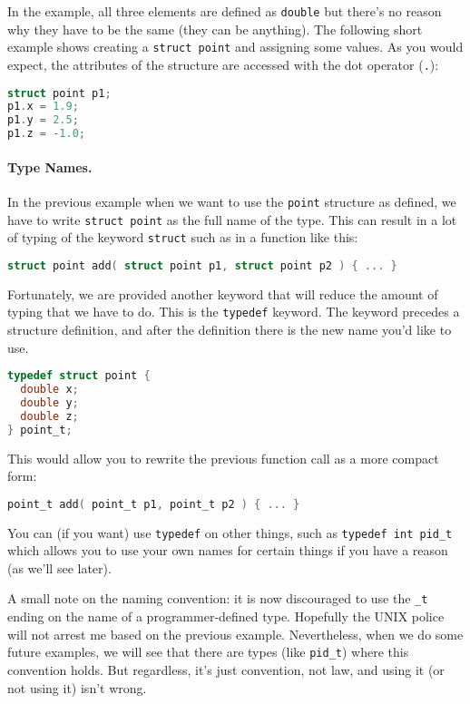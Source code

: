 In the example, all three elements are defined as \texttt{double} but there's no reason why they have to be the same (they can be anything). The following short example shows creating a \texttt{struct point} and assigning some values. As you would expect, the attributes of the structure are accessed with the dot operator (\texttt{.}):

\begin{lstlisting}[language=C]
struct point p1;
p1.x = 1.9;
p1.y = 2.5;
p1.z = -1.0;
\end{lstlisting}

\paragraph{Type Names.}
In the previous example when we want to use the \texttt{point} structure as defined, we have to write \texttt{struct point} as the full name of the type. This can result in a lot of typing of the keyword \texttt{struct} such as in a function like this:

\begin{lstlisting}[language=C]
struct point add( struct point p1, struct point p2 ) { ... }
\end{lstlisting}

Fortunately, we are provided another keyword that will reduce the amount of typing that we have to do. This is the \texttt{typedef} keyword. The keyword precedes a structure definition, and after the definition there is the new name you'd like to use.

\begin{lstlisting}[language=C]
typedef struct point {
  double x;
  double y;
  double z;
} point_t;
\end{lstlisting}

This would allow you to rewrite the previous function call as a more compact form:

\begin{lstlisting}[language=C]
point_t add( point_t p1, point_t p2 ) { ... }
\end{lstlisting}

You can (if you want) use \texttt{typedef} on other things, such as \texttt{typedef int pid\_t} which allows you to use your own names for certain things if you have a reason (as we'll see later).

A small note on the naming convention: it is now discouraged to use the \texttt{\_t} ending on the name of a programmer-defined type. Hopefully the UNIX police will not arrest me based on the previous example. Nevertheless, when we do some future examples, we will see that there are types (like \texttt{pid\_t}) where this convention holds. But regardless, it's just convention, not law, and using it (or not using it) isn't wrong.

